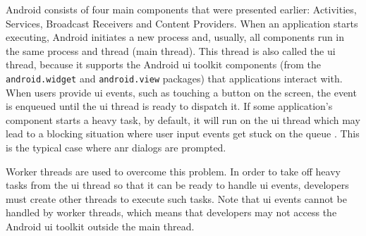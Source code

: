 Android consists of four main components that were presented earlier: Activities, Services, Broadcast Receivers and Content Providers. When an application starts executing, Android initiates a new process and, usually, all components run in the same process and thread (main thread). This thread is also called the \gls{ui} thread, because it supports the Android \gls{ui} toolkit components (from the \texttt{android.widget} and \texttt{android.view} packages) that applications interact with. When users provide \gls{ui} events, such as touching a button on the screen, the event is enqueued until the \gls{ui} thread is ready to dispatch it. If some application's component starts a heavy task, by default, it will run on the \gls{ui} thread which may lead to a blocking situation where user input events get stuck on the queue \cite{ProAndroid4:Apress}. This is the typical case where \gls{anr} dialogs are prompted.

Worker threads are used to overcome this problem. In order to take off heavy tasks from the \gls{ui} thread so that it can be ready to handle \gls{ui} events, developers must create other threads to execute such tasks. Note that \gls{ui} events cannot be handled by worker threads, which means that developers may not access the Android \gls{ui} toolkit outside the main thread.